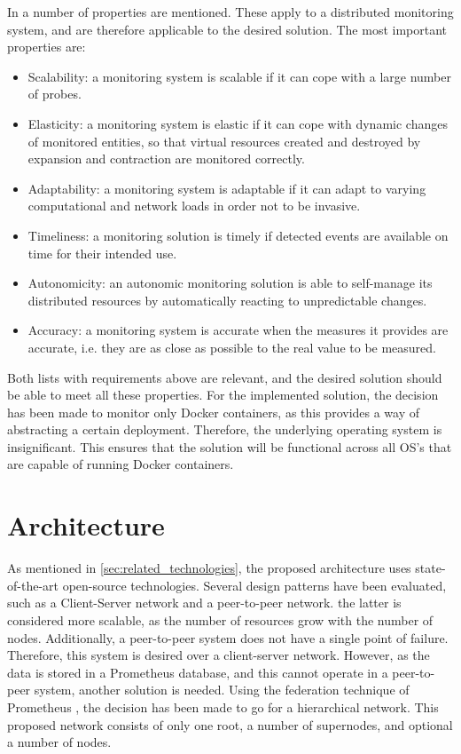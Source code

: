 \noindent
In \cite{aceto2013cloud} a number of properties are mentioned. These apply to a distributed monitoring system, and are therefore applicable to the desired solution. The most important properties are:
\begin{itemize}
    \item Scalability: a monitoring system is scalable if it can cope with a large number of probes.
    \item Elasticity: a monitoring system is elastic if it can cope with dynamic changes of monitored entities, so that virtual resources created and destroyed by expansion and contraction are monitored correctly.
    \item Adaptability: a monitoring system is adaptable if it can adapt to varying computational and network loads in order not to be invasive.
    \item Timeliness: a monitoring solution is timely if detected events are available on time for their intended use.
    \item Autonomicity: an autonomic monitoring solution is able to self-manage its distributed resources by automatically reacting to unpredictable changes.
    \item Accuracy: a monitoring system is accurate when the measures it provides are accurate, i.e. they are as close as possible to the real value to be measured.
\end{itemize}

\noindent
Both lists with requirements above are relevant, and the desired solution should be able to meet all these properties. For the implemented solution, the decision has been made to monitor only Docker containers, as this provides a way of abstracting a certain deployment. Therefore, the underlying operating system is insignificant. This ensures that the solution will be functional across all OS's that are capable of running Docker containers. 

\section{Architecture} \label{sec:architecture}
As mentioned in \autoref{sec:related_technologies}, the proposed architecture uses state-of-the-art open-source technologies. Several design patterns have been evaluated, such as a Client-Server network and a peer-to-peer network. the latter is considered more scalable, as the number of resources grow with the number of nodes. Additionally, a peer-to-peer system does not have a single point of failure. Therefore, this system is desired over a client-server network. However, as the data is stored in a Prometheus database, and this cannot operate in a peer-to-peer system, another solution is needed. Using the federation technique of Prometheus \cite{prometheus_federation}, the decision has been made to go for a hierarchical network. This proposed network consists of only one root, a number of supernodes, and optional a number of nodes.\\

